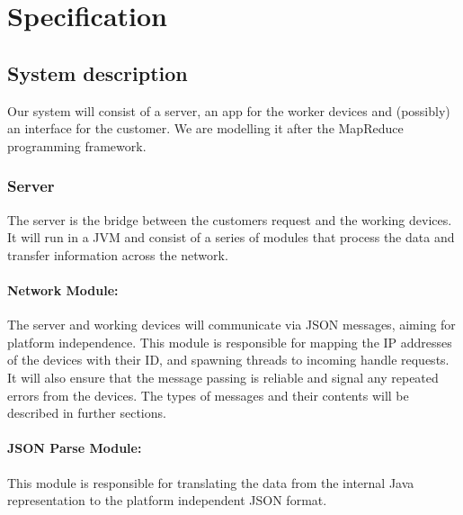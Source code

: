 \documentclass[a4paper,10pt]{article}
\begin{document}

\section{Specification}

\subsection{System description}

Our system will consist of a server, an app for the worker devices and (possibly) an interface for the customer. We are modelling it after the MapReduce programming framework.

\subsubsection{Server}
The server is the bridge between the customers request and the working devices. It will run in a JVM and consist of a series of modules that process the data and transfer information across the network.

\paragraph{Network Module:}

The server and working devices will communicate via JSON messages, aiming for platform independence. This module is responsible for mapping the IP addresses of the devices with their ID, and spawning threads to incoming handle requests. It will also ensure that the message passing is reliable and signal any repeated errors from the devices. The types of messages and their contents will be described in further sections.

\paragraph{JSON Parse Module:}

This module is responsible for translating the data from the internal Java representation to the platform independent JSON format. 

%
\end{document}
